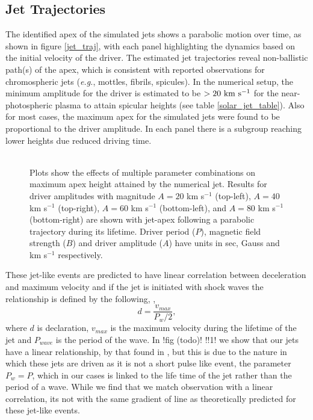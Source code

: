 \documentclass[12pt]{ociamthesis}
\newcommand{\np}{\\ \\}
\begin{document}
\subsection{Jet Trajectories}
\label{subsec:jet_traj}
The identified apex of the simulated jets shows a parabolic motion over time, as shown in figure \eqref{jet_traj}, with each panel highlighting the dynamics based on the initial velocity of the driver. The estimated jet trajectories reveal non-ballistic path(s) of the apex, which is consistent with reported observations \citep{Hansteen2006ApJ, Rouppe2007ApJ660L169R, Pontieu2007PASJ} for chromospheric jets (\textit{e.g.}, mottles, fibrils, spicules). In the numerical setup, the minimum amplitude for the driver is estimated to be $>20 ~\rm{km ~s^{-1}}$ for the near-photospheric plasma to attain spicular heights (see table \ref{solar_jet_table}). Also for most cases, the maximum apex for the simulated jets were found to be proportional to the driver amplitude. In each panel there is a subgroup reaching lower heights due reduced driving time. \np  
\begin{figure}
\captionsetup[subfigure]{labelformat=empty}
\centering
{} 
\caption{Plots show the effects of multiple parameter combinations on maximum apex height attained by the numerical jet. Results for driver amplitudes with magnitude $A = 20$ km s$^{-1}$ (top-left), $A = 40$ km s$^{-1}$ (top-right), $A = 60$ km s$^{-1}$ (bottom-left), and $A = 80$ km s$^{-1}$ (bottom-right) are shown with jet-apex following a parabolic trajectory during its lifetime. Driver period ($P$), magnetic field strength ($B$) and driver amplitude ($A$) have units in sec, Gauss and km s$^{-1}$ respectively.}
\label{jet_traj}
\end{figure}
These jet-like events are predicted to have linear correlation between deceleration and maximum velocity and if the jet is initiated with shock waves the relationship is defined by the following, \citep{Heggland2007ApJ6661277H},
\begin{equation}
d = \frac{v_{max}}{P_{w}/2},
\end{equation}
where $d$ is declaration, $v_{max}$ is the maximum velocity during the lifetime of the jet and $P_{wave}$ is the period of the wave. In !fig (todo)! !!1! we show that our jets have a linear relationship, by that found in \citep{Heggland2007ApJ6661277H}, but this is due to the nature in which these jets are driven as it is not a short pulse like event, the parameter $P_{w}=P$, which in our cases is linked to the life time of the jet rather than the period of a wave. While we find that we match observation with a linear correlation, its not with the same gradient of line as theoretically predicted for these jet-like events.
\end{document}
